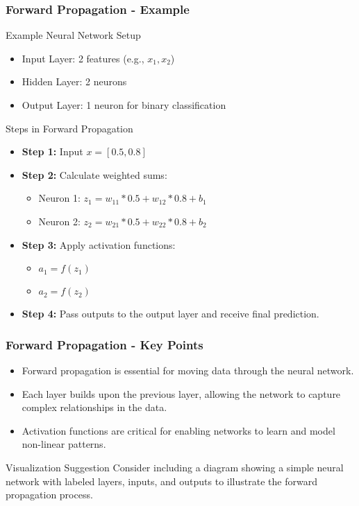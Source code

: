 \documentclass[aspectratio=169]{beamer}
\begin{document}
\begin{frame}[fragile]
    \frametitle{Forward Propagation - Example}
    \begin{block}{Example Neural Network Setup}
        \begin{itemize}
            \item Input Layer: 2 features (e.g., \( x_1, x_2 \))
            \item Hidden Layer: 2 neurons
            \item Output Layer: 1 neuron for binary classification
        \end{itemize}
    \end{block}
    
    \begin{block}{Steps in Forward Propagation}
        \begin{itemize}
            \item \textbf{Step 1:} Input \( x = [0.5, 0.8] \)
            \item \textbf{Step 2:} Calculate weighted sums:
            \begin{itemize}
                \item Neuron 1: \( z_1 = w_{11}*0.5 + w_{12}*0.8 + b_1 \)
                \item Neuron 2: \( z_2 = w_{21}*0.5 + w_{22}*0.8 + b_2 \)
            \end{itemize}
            \item \textbf{Step 3:} Apply activation functions:
            \begin{itemize}
                \item \( a_1 = f(z_1) \)
                \item \( a_2 = f(z_2) \)
            \end{itemize}
            \item \textbf{Step 4:} Pass outputs to the output layer and receive final prediction.
        \end{itemize}
    \end{block}
\end{frame}

\begin{frame}[fragile]
    \frametitle{Forward Propagation - Key Points}
    \begin{itemize}
        \item Forward propagation is essential for moving data through the neural network.
        \item Each layer builds upon the previous layer, allowing the network to capture complex relationships in the data.
        \item Activation functions are critical for enabling networks to learn and model non-linear patterns.
    \end{itemize}
    
    \begin{block}{Visualization Suggestion}
        Consider including a diagram showing a simple neural network with labeled layers, inputs, and outputs to illustrate the forward propagation process.
    \end{block}
\end{frame}
\end{document}
